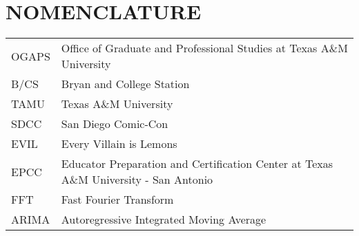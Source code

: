 %
%
%
%


\chapter*{NOMENCLATURE}

\vspace{-0.5in}
	\begin{table}[htbp]
	    \begin{tabular}{@{}p{} p{}@{}}
		OGAPS	&	Office of Graduate and Professional Studies at Texas A\&M University\\	[2ex]
		B/CS		&	Bryan and College Station\\	[2ex] %
		TAMU			&	Texas A\&M University\\	[2ex]
		SDCC & San Diego Comic-Con\\ [2ex]
		EVIL & Every Villain is Lemons\\ [2ex]
		EPCC & Educator Preparation and Certification Center at Texas A\&M University - San Antonio\\ [2ex]
		FFT & Fast Fourier Transform\\ [2ex]
		ARIMA & Autoregressive Integrated Moving Average\\ [2ex]
	    \end{tabular}%
	\end{table}

\pagebreak{}